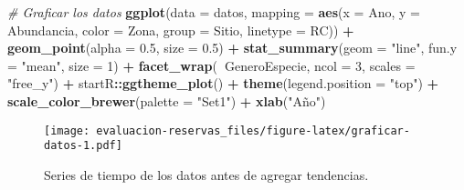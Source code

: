 \documentclass[]{krantz}
\newenvironment{Shaded}{\begin{snugshade}}{\end{snugshade}}
\newcommand{\CommentTok}[1]{\textcolor[rgb]{0.56,0.35,0.01}{\textit{#1}}}
\newcommand{\DataTypeTok}[1]{\textcolor[rgb]{0.13,0.29,0.53}{#1}}
\newcommand{\DecValTok}[1]{\textcolor[rgb]{0.00,0.00,0.81}{#1}}
\newcommand{\FloatTok}[1]{\textcolor[rgb]{0.00,0.00,0.81}{#1}}
\newcommand{\KeywordTok}[1]{\textcolor[rgb]{0.13,0.29,0.53}{\textbf{#1}}}
\newcommand{\NormalTok}[1]{#1}
\newcommand{\OperatorTok}[1]{\textcolor[rgb]{0.81,0.36,0.00}{\textbf{#1}}}
\newcommand{\StringTok}[1]{\textcolor[rgb]{0.31,0.60,0.02}{#1}}
\begin{document}
\begin{Shaded}
\begin{Highlighting}[]
\CommentTok{# Graficar los datos}
\KeywordTok{ggplot}\NormalTok{(}\DataTypeTok{data =}\NormalTok{ datos,}
       \DataTypeTok{mapping =} \KeywordTok{aes}\NormalTok{(}\DataTypeTok{x =}\NormalTok{ Ano, }\DataTypeTok{y =}\NormalTok{ Abundancia,}
                     \DataTypeTok{color =}\NormalTok{ Zona, }\DataTypeTok{group =}\NormalTok{ Sitio, }\DataTypeTok{linetype =}\NormalTok{ RC)) }\OperatorTok{+}
\StringTok{  }\KeywordTok{geom_point}\NormalTok{(}\DataTypeTok{alpha =} \FloatTok{0.5}\NormalTok{, }\DataTypeTok{size =} \FloatTok{0.5}\NormalTok{) }\OperatorTok{+}
\StringTok{  }\KeywordTok{stat_summary}\NormalTok{(}\DataTypeTok{geom =} \StringTok{"line"}\NormalTok{, }\DataTypeTok{fun.y =} \StringTok{"mean"}\NormalTok{, }\DataTypeTok{size =} \DecValTok{1}\NormalTok{) }\OperatorTok{+}
\StringTok{  }\KeywordTok{facet_wrap}\NormalTok{(}\OperatorTok{~}\NormalTok{GeneroEspecie, }\DataTypeTok{ncol =} \DecValTok{3}\NormalTok{, }\DataTypeTok{scales =} \StringTok{"free_y"}\NormalTok{) }\OperatorTok{+}
\StringTok{  }\NormalTok{startR}\OperatorTok{::}\KeywordTok{ggtheme_plot}\NormalTok{() }\OperatorTok{+}
\StringTok{  }\KeywordTok{theme}\NormalTok{(}\DataTypeTok{legend.position =} \StringTok{"top"}\NormalTok{) }\OperatorTok{+}
\StringTok{  }\KeywordTok{scale_color_brewer}\NormalTok{(}\DataTypeTok{palette =} \StringTok{"Set1"}\NormalTok{) }\OperatorTok{+}
\StringTok{  }\KeywordTok{xlab}\NormalTok{(}\StringTok{"Año"}\NormalTok{)}
\end{Highlighting}
\end{Shaded}

\begin{figure}
\centering
\texttt{[image: evaluacion-reservas\_files/figure-latex/graficar-datos-1.pdf]}
\caption{\label{fig:graficar-datos}Series de tiempo de los datos antes de agregar tendencias.}
\end{figure}
\end{document}
